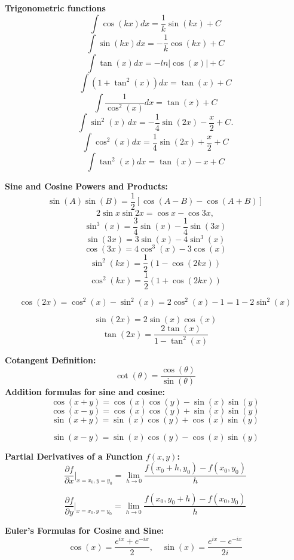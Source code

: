 \documentclass[a4paper,11pt]{article}
\renewcommand{\textbf}[1]{{\scriptsize	\bfseries #1}}
\begin{document}
\begin{footnotesize}
\begin{multicols}{2}
\begin{minipage}{\linewidth}
\textbf{Trigonometric functions} \\[-0.2cm]
\[
\int \cos(kx) dx = \frac{1}{k}\sin(kx) + C
\]
\[
\int \sin(kx) dx = -\frac{1}{k}\cos(kx) + C
\]
\[
\int \tan(x) dx = -ln\left|\cos(x)\right| + C
\]
\[
\int (1+\tan^2(x)) dx = \tan(x) + C
\]
\[
\int \frac{1}{\cos^2(x)} dx = \tan(x) +C
\]
\[
\int \sin^2(x) \, dx = -\frac{1}{4} \sin(2x) - \frac{x}{2} + C.
\]
\[
\int \cos^2(x) dx = \frac{1}{4}\sin(2x) + \frac{x}{2}+C
\]
\[
\int \tan^2(x) dx = \tan(x) - x + C
\]



\end{minipage}
\begin{minipage}{\linewidth}
\textbf{Sine and Cosine Powers and Products:}
\[
\sin(A)\sin(B) = \frac{1}{2} [\cos(A-B) - \cos(A+B)]
\]
\[
2 \sin x \sin 2x = \cos x - \cos 3x,
\]
\[
\sin^3(x) = \frac{3}{4}\sin(x) - \frac{1}{4}\sin(3x)
\]
\[
\sin(3x) = 3\sin(x) - 4\sin^3(x)
\]
\[
\cos(3x) = 4\cos^3(x) - 3\cos(x)
\]
\[
\sin^2(kx) = \frac{1}{2} (1 - \cos(2kx)) 
\]
\[
\cos^2(kx)  = \frac{1}{2} (1 + \cos(2kx))
\]

\[
\cos(2x) = \cos^2(x) - \sin^2(x) = 2\cos^2(x) - 1 = 1 - 2\sin^2(x)
\]

\[
\sin(2x) = 2\sin(x)\cos(x)
\]
\[
\tan(2x) = \frac{2\tan(x)}{1-\tan^2(x)}
\]
\end{minipage}
\begin{minipage}{\linewidth}
\textbf{Cotangent Definition:}
\[
\cot(\theta) = \frac{\cos(\theta)}{\sin(\theta)}
\]
\textbf{Addition formulas for sine and cosine:}
\[
\cos(x + y) = \cos(x)\cos(y) - \sin(x)\sin(y)
\]
\[
\cos(x - y) = \cos(x)\cos(y) + \sin(x)\sin(y)
\]
\[
\sin(x + y) = \sin(x)\cos(y) + \cos(x)\sin(y)
\]

\[
\sin(x - y) = \sin(x)\cos(y) - \cos(x)\sin(y)
\]

\end{minipage}
\begin{minipage}{\linewidth}

\textbf{Partial Derivatives of a Function $f(x, y)$:} \\[-0.2cm]
\[
\frac{\partial f}{\partial x} \Bigg|_{x=x_0, y=y_0} = \lim_{h \to 0} \frac{f(x_0 + h, y_0) - f(x_0, y_0)}{h}
\]

\[
\frac{\partial f}{\partial y} \Bigg|_{x=x_0, y=y_0} = \lim_{h \to 0} \frac{f(x_0, y_0 + h) - f(x_0, y_0)}{h}
\]

\end{minipage}

\begin{minipage}{\linewidth}
\textbf{Euler's Formulas for Cosine and Sine:}
\[
\cos(x) = \frac{e^{ix} + e^{-ix}}{2}, \quad \sin(x) = \frac{e^{ix} - e^{-ix}}{2i}
\]
\end{minipage}


\end{multicols}
\end{footnotesize}
\end{document}
